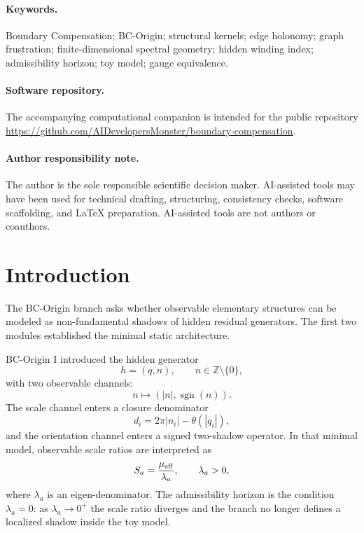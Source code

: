 \documentclass[11pt]{article}
\newcommand{\sgn}{\operatorname{sgn}}
\begin{document}
\paragraph{Keywords.}
Boundary Compensation; BC-Origin; structural kernels; edge holonomy; graph frustration; finite-dimensional spectral geometry; hidden winding index; admissibility horizon; toy model; gauge equivalence.

\paragraph{Software repository.}
The accompanying computational companion is intended for the public repository
\url{https://github.com/AIDevelopersMonster/boundary-compensation}.

\paragraph{Author responsibility note.}
The author is the sole responsible scientific decision maker. AI-assisted tools may have been used for technical drafting, structuring, consistency checks, software scaffolding, and LaTeX preparation. AI-assisted tools are not authors or coauthors.

\tableofcontents

\section{Introduction}

The BC-Origin branch asks whether observable elementary structures can be modeled as non-fundamental shadows of hidden residual generators. The first two modules established the minimal static architecture.

BC-Origin I introduced the hidden generator
\begin{equation}
 h=(q,n),\qquad n\in\mathbb Z\setminus\{0\},
\end{equation}
with two observable channels:
\begin{equation}
 n\longmapsto (|n|,\sgn(n)).
\end{equation}
The scale channel enters a closure denominator
\begin{equation}
 d_i=2\pi |n_i|-\theta(|q_i|),
\end{equation}
and the orientation channel enters a signed two-shadow operator. In that minimal model, observable scale ratios are interpreted as
\begin{equation}
 S_a=\frac{\mu_{\rm eff}}{\lambda_a},\qquad \lambda_a>0,
\end{equation}
where $\lambda_a$ is an eigen-denominator. The admissibility horizon is the condition $\lambda_a=0$: as $\lambda_a\to0^+$ the scale ratio diverges and the branch no longer defines a localized shadow inside the toy model.
\end{document}
